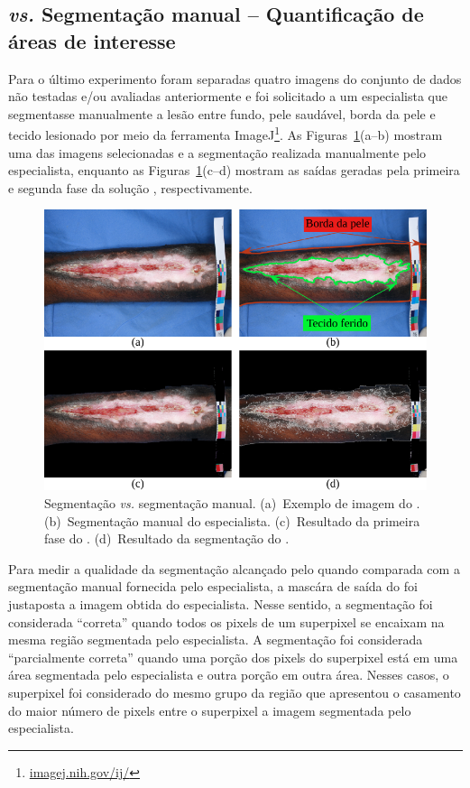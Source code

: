 \subsection{\system \textit{vs.} Segmentação manual -- Quantificação de áreas de interesse} \label{sec:exp_vs_especialista}


Para o último experimento foram separadas quatro imagens do conjunto de dados \dataset não testadas e/ou avaliadas anteriormente e foi solicitado a um especialista que segmentasse manualmente a lesão entre fundo, pele saudável, borda da pele e tecido lesionado por meio da ferramenta ImageJ\footnote{\url{imagej.nih.gov/ij/}}.
As Figuras~\ref{fig:quantification}(a--b) mostram uma das imagens selecionadas e a segmentação realizada manualmente pelo especialista, enquanto as Figuras~\ref{fig:quantification}(c--d) mostram as saídas geradas pela primeira e segunda fase da solução \system, respectivamente.

\begin{figure}[!t]
\centering
\includegraphics[scale=.9]{_fig/quantification.pdf}
\caption[Segmentação \system \textit{vs.} segmentação manual]{
Segmentação \system \textit{vs.} segmentação manual.
(a)~Exemplo de imagem do \dataset.
(b)~Segmentação manual do especialista.
(c)~Resultado da primeira fase do \system.
(d)~Resultado da segmentação do \system.}
\label{fig:quantification}
\end{figure}

Para medir a qualidade da segmentação alcançado pelo \system quando comparada com a segmentação manual fornecida pelo especialista, a mascára de saída do \system foi justaposta a imagem obtida do especialista.
Nesse sentido, a segmentação foi considerada ``correta'' quando todos os pixels de um superpixel se encaixam na mesma região segmentada pelo especialista.
A segmentação foi considerada ``parcialmente correta'' quando uma porção dos pixels do superpixel está em uma área segmentada pelo especialista e outra porção em outra área.
Nesses casos, o superpixel foi considerado do mesmo grupo da região que apresentou o casamento do maior número de pixels entre o superpixel a imagem segmentada pelo especialista.

